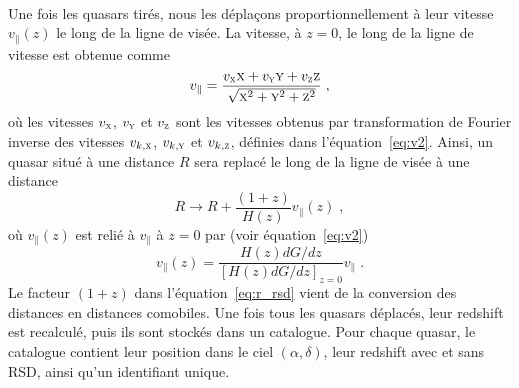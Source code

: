 \paragraph{}
Une fois les quasars tirés, nous les déplaçons proportionnellement à leur vitesse $v_{\parallel}(z)$ le long de la ligne de visée.
La vitesse, à $z=0$, le long de la ligne de vitesse est obtenue comme
\begin{equation}
  \label{eq:vpar1}
  v_{\parallel} = \frac{v_{\textsc{x}} \textsc{x} + v_{\textsc{y}} \textsc{y} + v_{\textsc{z}} \textsc{z}}{\sqrt{\textsc{x}^2 + \textsc{y}^2 + \textsc{z}^2}} \; ,
\end{equation}
où les vitesses $v_{\textsc{x}}$, $v_{\textsc{y}}$ et $v_{\textsc{z}}$ sont les vitesses obtenus par transformation de Fourier inverse des vitesses $v_{k,\textsc{x}}$, $v_{k,\textsc{y}}$ et $v_{k,\textsc{z}}$, définies dans l'équation~\ref{eq:v2}.
Ainsi, un quasar situé à une distance $R$ sera replacé le long de la ligne de visée à une distance
\begin{equation}
  \label{eq:r_rsd}
 R \rightarrow  R + \frac{(1+z)}{H(z)} v_{\parallel}(z) \; ,  %
\end{equation}
où $v_{\parallel}(z)$ est relié à $v_{\parallel}$ à $z = 0$ par (voir équation~\ref{eq:v2})
\begin{equation}
  v_{\parallel}(z) = \frac{H(z) dG/dz}{[H(z) dG/dz]_{z=0}} v_{\parallel} \; .
\end{equation}
Le facteur $(1+z)$ dans l'équation~\ref{eq:r_rsd} vient de la conversion des distances en distances comobiles. Une fois tous les quasars déplacés, leur redshift est recalculé, puis ils sont stockés dans un catalogue. Pour chaque quasar, le catalogue contient leur position dans le ciel $(\alpha, \delta)$, leur redshift avec et sans RSD, ainsi qu'un identifiant unique.


